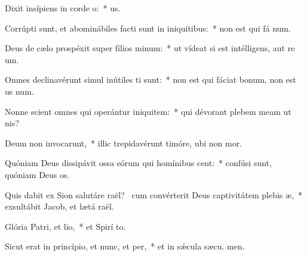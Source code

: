 \item Dixit insípiens in corde o:~*   us.
\item Corrúpti sunt, et abominábiles facti sunt in iniquitibus:~* non est qui fá num.
\item Deus de cælo prospéxit super fílios minum:~* ut vídeat si est intélligens, aut re um.
\item Omnes declinavérunt simul inútiles ti sunt:~* non est qui fáciat bonum, non est us  num.
\item Nonne scient omnes qui operántur iniquitem:~* qui dévorant plebem meam ut  nis?
\item Deum non invocarunt,~* illic trepidavérunt timóre, ubi non  mor.
\item Quóniam Deus dissipávit ossa eórum qui homínibus cent:~* confúsi sunt, quóniam Deus  os.
\item Quis dabit ex Sion salutáre raël?~\pscross{} cum convérterit Deus captivitátem plebis æ,~* exsultábit Jacob, et lætá raël.
\item Glória Patri, et lio,~* et Spirí to.
\item Sicut erat in princípio, et nunc, et per,~* et in sǽcula sæcu. men.
